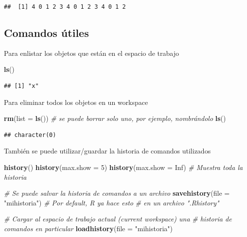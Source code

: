 \documentclass[]{article}
\newenvironment{Shaded}{\begin{snugshade}}{\end{snugshade}}
\newcommand{\KeywordTok}[1]{\textcolor[rgb]{0.13,0.29,0.53}{\textbf{{#1}}}}
\newcommand{\DataTypeTok}[1]{\textcolor[rgb]{0.13,0.29,0.53}{{#1}}}
\newcommand{\DecValTok}[1]{\textcolor[rgb]{0.00,0.00,0.81}{{#1}}}
\newcommand{\StringTok}[1]{\textcolor[rgb]{0.31,0.60,0.02}{{#1}}}
\newcommand{\CommentTok}[1]{\textcolor[rgb]{0.56,0.35,0.01}{\textit{{#1}}}}
\newcommand{\OtherTok}[1]{\textcolor[rgb]{0.56,0.35,0.01}{{#1}}}
\newcommand{\NormalTok}[1]{{#1}}
\begin{document}
\begin{Shaded}
\end{Shaded}

\begin{verbatim}
##  [1] 4 0 1 2 3 4 0 1 2 3 4 0 1 2
\end{verbatim}

\subsection{Comandos útiles}\label{comandos-utiles}

Para enlistar los objetos que están en el espacio de trabajo

\begin{Shaded}
\begin{Highlighting}[]
\KeywordTok{ls}\NormalTok{()}
\end{Highlighting}
\end{Shaded}

\begin{verbatim}
## [1] "x"
\end{verbatim}

Para eliminar todos los objetos en un workspace

\begin{Shaded}
\begin{Highlighting}[]
\KeywordTok{rm}\NormalTok{(}\DataTypeTok{list =} \KeywordTok{ls}\NormalTok{()) }\CommentTok{# se puede borrar solo uno, por ejemplo, nombrándolo}
\KeywordTok{ls}\NormalTok{()}
\end{Highlighting}
\end{Shaded}

\begin{verbatim}
## character(0)
\end{verbatim}

También se puede utilizar/guardar la historia de comandos utilizados

\begin{Shaded}
\begin{Highlighting}[]
\KeywordTok{history}\NormalTok{()}
\KeywordTok{history}\NormalTok{(}\DataTypeTok{max.show =} \DecValTok{5}\NormalTok{)}
\KeywordTok{history}\NormalTok{(}\DataTypeTok{max.show =} \OtherTok{Inf}\NormalTok{) }\CommentTok{# Muestra toda la historia}

\CommentTok{# Se puede salvar la historia de comandos a un archivo}
\KeywordTok{savehistory}\NormalTok{(}\DataTypeTok{file =} \StringTok{"mihistoria"}\NormalTok{) }\CommentTok{# Por default, R ya hace esto }
\CommentTok{# en un archivo ".Rhistory"}

\CommentTok{# Cargar al espacio de trabajo actual (current workspace) una }
\CommentTok{# historia de comandos en particular}
\KeywordTok{loadhistory}\NormalTok{(}\DataTypeTok{file =} \StringTok{"mihistoria"}\NormalTok{)}
\end{Highlighting}
\end{Shaded}
\end{document}
